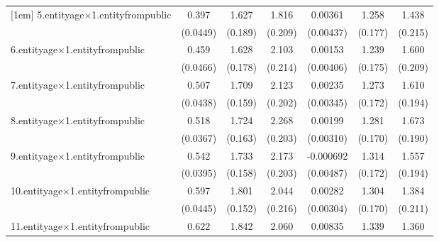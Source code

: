 {\begin{tabular}{l*{6}{c}}
[1em]
5.entityage$\times$1.entityfrompublic&       0.397\sym{***}&       1.627\sym{***}&       1.816\sym{***}&     0.00361         &       1.258\sym{***}&       1.438\sym{***}\\
            &    (0.0449)         &     (0.189)         &     (0.209)         &   (0.00437)         &     (0.177)         &     (0.215)         \\
[1em]
6.entityage$\times$1.entityfrompublic&       0.459\sym{***}&       1.628\sym{***}&       2.103\sym{***}&     0.00153         &       1.239\sym{***}&       1.600\sym{***}\\
            &    (0.0466)         &     (0.178)         &     (0.214)         &   (0.00406)         &     (0.175)         &     (0.209)         \\
[1em]
7.entityage$\times$1.entityfrompublic&       0.507\sym{***}&       1.709\sym{***}&       2.123\sym{***}&     0.00235         &       1.273\sym{***}&       1.610\sym{***}\\
            &    (0.0438)         &     (0.159)         &     (0.202)         &   (0.00345)         &     (0.172)         &     (0.194)         \\
[1em]
8.entityage$\times$1.entityfrompublic&       0.518\sym{***}&       1.724\sym{***}&       2.268\sym{***}&     0.00199         &       1.281\sym{***}&       1.673\sym{***}\\
            &    (0.0367)         &     (0.163)         &     (0.203)         &   (0.00310)         &     (0.170)         &     (0.190)         \\
[1em]
9.entityage$\times$1.entityfrompublic&       0.542\sym{***}&       1.733\sym{***}&       2.173\sym{***}&   -0.000692         &       1.314\sym{***}&       1.557\sym{***}\\
            &    (0.0395)         &     (0.158)         &     (0.203)         &   (0.00487)         &     (0.172)         &     (0.194)         \\
[1em]
10.entityage$\times$1.entityfrompublic&       0.597\sym{***}&       1.801\sym{***}&       2.044\sym{***}&     0.00282         &       1.304\sym{***}&       1.384\sym{***}\\
            &    (0.0445)         &     (0.152)         &     (0.216)         &   (0.00304)         &     (0.170)         &     (0.211)         \\
[1em]
11.entityage$\times$1.entityfrompublic&       0.622\sym{***}&       1.842\sym{***}&       2.060\sym{***}&     0.00835         &       1.339\sym{***}&       1.360\sym{***}\\

\end{tabular}}
